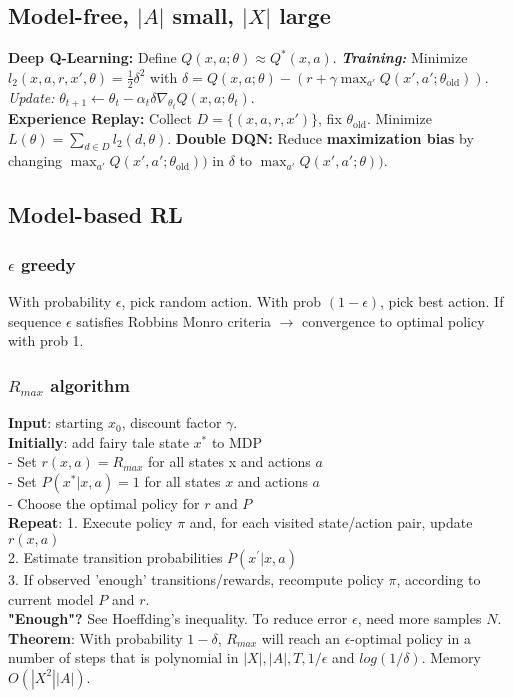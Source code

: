 \subsection{Model-free, $|A|$ small, $|X|$ large}
\textbf{Deep Q-Learning:} Define $Q(x,a;\theta) \approx Q^*(x,a)$.
\textbf{\emph{Training:}} Minimize $ l_2(x,a,r,x',\theta) = \frac{1}{2}\delta^2$ with $\delta = Q(x,a;\theta) - (r+\gamma\max_{a'}Q(x',a';\theta_\mathrm{old}))$.\\
\emph{Update:} $\theta_{t+1} \leftarrow \theta_t - \alpha_t\delta\nabla_{\theta_t}Q(x,a;\theta_t)$.\\
\textbf{Experience Replay:} Collect $D=\{(x,a,r,x')\}$, fix $\theta_\mathrm{old}$. Minimize $L(\theta) = \sum_{d\in D}l_2(d,\theta)$.
\textbf{Double DQN:} Reduce \textbf{maximization bias} by changing $\max_{a'}Q(x',a';\theta_\mathrm{old}))$ in $\delta$ to $\max_{a'}Q(x',a';\theta))$. 
\subsection{Model-based RL}

\subsubsection{$\epsilon$ greedy}
With probability $\epsilon$, pick random action. With prob $(1-\epsilon)$, pick best action. If sequence $\epsilon$ satisfies Robbins Monro criteria $\rightarrow$ convergence to optimal policy with prob 1.

\subsubsection{$R_{max}$ algorithm}
\textbf{Input}: starting $x_0$, discount factor $\gamma$.\\
\textbf{Initially}: add fairy tale state $x^*$ to MDP\\
- Set $r(x,a)=R_{max}$ for all states x and actions $a$\\
- Set $P(x^*|x,a)=1$ for all states $x$ and actions $a$\\
- Choose the optimal policy for $r$ and $P$\\
\textbf{Repeat}:
1. Execute policy $\pi$ and, for each visited state/action pair, update $r(x,a)$\\
2. Estimate transition probabilities $P(x^{'}|x,a)$\\
3. If observed 'enough' transitions/rewards, recompute policy $\pi$, according to current model $P$ and $r$.\\
\textbf{"Enough"?} See Hoeffding's inequality. To reduce error $\epsilon$, need more samples $N$.\\
\textbf{Theorem}: With probability $1-\delta$, $R_{max}$ will reach an $\epsilon$-optimal policy in a number of steps that is polynomial in $|X|, |A|, T, 1/\epsilon$ and $log(1/\delta)$. Memory $O(|X^2||A|)$. 

